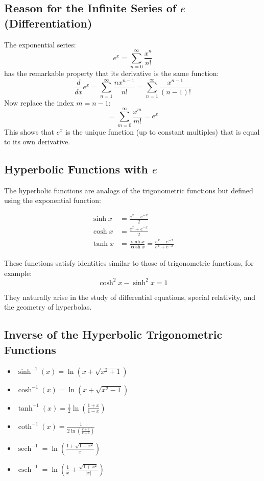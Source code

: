 \subsection{Reason for the Infinite Series of \texorpdfstring{\(e\)}{e} (Differentiation)}

The exponential series:
\[
e^x = \sum_{n=0}^{\infty} \frac{x^n}{n!}
\]
has the remarkable property that its derivative is the same function:
\[
\frac{d}{dx} e^x = \sum_{n=1}^{\infty} \frac{n x^{n-1}}{n!} = \sum_{n=1}^{\infty} \frac{x^{n-1}}{(n-1)!}
\]
Now replace the index \(m = n - 1\):
\[
= \sum_{m=0}^{\infty} \frac{x^m}{m!} = e^x
\]
This shows that \(e^x\) is the unique function (up to constant multiples) that is equal to its own derivative.

\subsection{Hyperbolic Functions with \texorpdfstring{\(e\)}{e}}

The hyperbolic functions are analogs of the trigonometric functions but defined using the exponential function:

\begin{align*}
\sinh x &= \frac{e^x - e^{-x}}{2} \\
\cosh x &= \frac{e^x + e^{-x}}{2} \\
\tanh x &= \frac{\sinh x}{\cosh x} = \frac{e^x - e^{-x}}{e^x + e^{-x}}
\end{align*}

These functions satisfy identities similar to those of trigonometric functions, for example:
\[
\cosh^2 x - \sinh^2 x = 1
\]

They naturally arise in the study of differential equations, special relativity, and the geometry of hyperbolas.

\subsection{Inverse of the Hyperbolic Trigonometric Functions}

\begin{itemize}[label=\(-\)]
    \item \(\sinh^{-1}(x) = \ln(x + \sqrt{x^2 + 1})\)
    \item \(\cosh^{-1}(x) = \ln(x + \sqrt{x^2 - 1})\)
    \item \(\tanh^{-1}(x) = \frac{1}{2} \ln\left(\frac{1 + x}{1 - x}\right)\)
    \item \(\coth^{-1}(x) = \frac{1}{2 \ln\left(\frac{x + 1}{x - 1}\right)}\)
    \item \(\operatorname{sech}^{-1} = \ln\left(\frac{1 + \sqrt{1 - x^2}}{x}\right)\)
    \item \(\operatorname{csch}^{-1} = \ln\left( \frac{1}{x} + \frac{\sqrt{1 + x^2}}{|x|}\right)\) 
\end{itemize}
\newpage